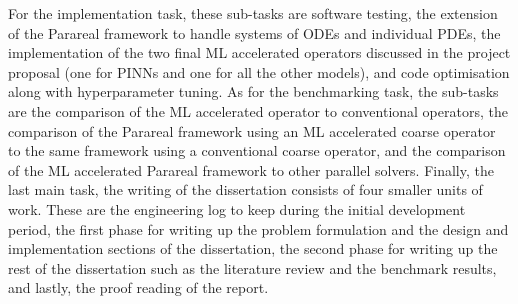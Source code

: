 \documentclass{article}
\begin{document}
For the implementation task, these sub-tasks are software testing, the extension of the Parareal framework to handle systems of ODEs and individual PDEs, the implementation of the two final ML accelerated operators discussed in the project proposal (one for PINNs and one for all the other models), and code optimisation along with hyperparameter tuning. As for the benchmarking task, the sub-tasks are the comparison of the ML accelerated operator to conventional operators, the comparison of the Parareal framework using an ML accelerated coarse operator to the same framework using a conventional coarse operator, and the comparison of the ML accelerated Parareal framework to other parallel solvers. Finally, the last main task, the writing of the dissertation consists of four smaller units of work. These are the engineering log to keep during the initial development period, the first phase for writing up the problem formulation and the design and implementation sections of the dissertation, the second phase for writing up the rest of the dissertation such as the literature review and the benchmark results, and lastly, the proof reading of the report.
\end{document}
